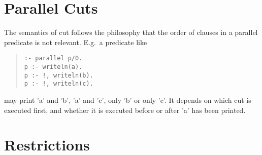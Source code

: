 \section{Parallel Cuts}
The semantics of cut follows the philosophy that the order of clauses in
a parallel predicate is not relevant. E.g.\ a predicate like
\begin{quote}\begin{verbatim}
:- parallel p/0.
p :- writeln(a).
p :- !, writeln(b).
p :- !, writeln(c).
\end{verbatim}\end{quote}
may print 'a' and 'b', 'a' and 'c', only 'b' or only 'c'.
It depends on which cut is executed first,
and whether it is executed before or after 'a' has been printed.

\section{Restrictions}

